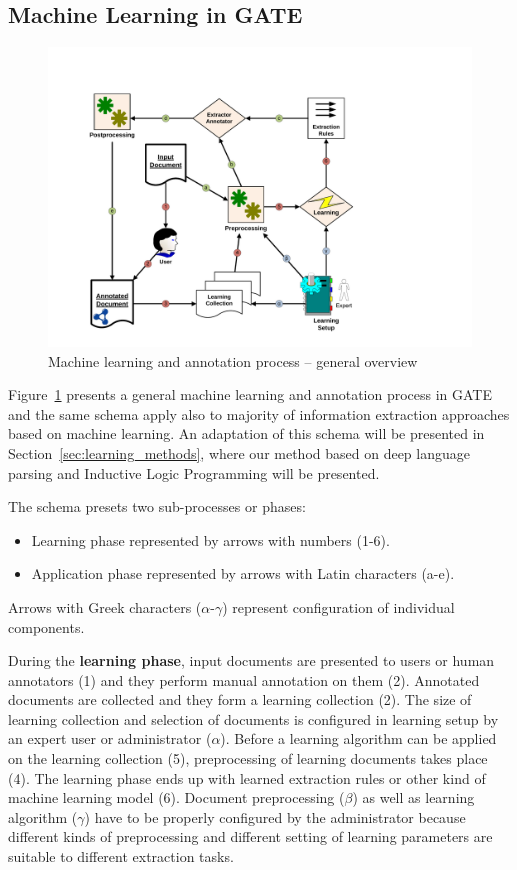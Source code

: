 \subsection{Machine Learning in GATE} \label{sec:third_gate_ML}

\begin{figure}[b!]
\centering
\includegraphics[angle=-90, width=0.8\hsize]{../img/ch10/annotation_process}
\caption{Machine learning and annotation process -- general overview}
\label{fig:ExtractionProcessIntro}
\end{figure}


Figure~\ref{fig:ExtractionProcessIntro} presents a general machine learning and annotation process in GATE and the same schema apply also to majority of information extraction approaches based on machine learning. An adaptation of this schema will be presented in Section~\ref{sec:learning_methods}, where our method based on deep language parsing and Inductive Logic Programming will be presented.

The schema presets two sub-processes or phases:

\begin{itemize}
	\item Learning phase represented by arrows with numbers (1-6).
	\item Application phase represented by arrows with Latin characters (a-e).
\end{itemize}

Arrows with Greek characters ($\alpha$-$\gamma$) represent configuration of individual components.

\medskip

During the \textbf{learning phase}, input documents are presented to users or human annotators (1) and they perform manual annotation on them (2). Annotated documents are collected and they form a learning collection (2). The size of learning collection and selection of documents is configured in learning setup by an expert user or administrator ($\alpha$). Before a learning algorithm can be applied on the learning collection (5), preprocessing of learning documents takes place (4). The learning phase ends up with learned extraction rules or other kind of machine learning model (6). Document preprocessing ($\beta$) as well as learning algorithm ($\gamma$) have to be properly configured by the administrator because different kinds of preprocessing and different setting of learning parameters are suitable to different extraction tasks.

